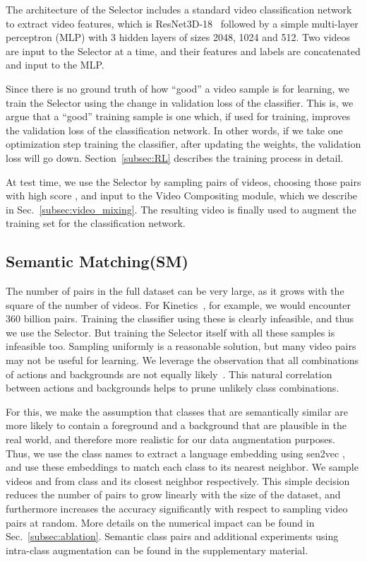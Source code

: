 \documentclass[runningheads]{llncs}
\newcommand{\SemanticMatch}{Semantic Matching\xspace}
\newcommand{\VideoMix}{Video Compositing\xspace}
\begin{document}
The architecture of the Selector includes a standard video classification network to extract video features, which is ResNet3D-18~\cite{resnet} followed by a simple multi-layer perceptron (MLP) with 3 hidden layers of sizes 2048, 1024 and 512. Two videos are input to the Selector at a time, and their features and labels are concatenated and input to the MLP. 

Since there is no ground truth of how ``good'' a video sample is for learning, we train the Selector using the change in validation loss of the classifier. This is, we argue that a ``good'' training sample is one which, if used for training, improves the validation loss of the classification network. In other words, if we take one optimization step training the classifier, after updating the weights, the validation loss will go down. Section~\ref{subsec:RL} describes the training process in detail. 


At test time, we use the Selector by sampling pairs of videos, choosing those pairs with high score , and input to the \VideoMix module, which we describe in Sec.~\ref{subsec:video_mixing}. The resulting video is finally used to augment the training set for the classification network. 






\subsection{\SemanticMatch (SM)}



The number of pairs in the full dataset can be very large, as it grows with the square of the number of videos. For Kinetics~\cite{carreira2017quo}, for example, we would encounter 360 billion pairs. Training the classifier using these is clearly infeasible, and thus we use the Selector. But training the Selector itself with all these samples is infeasible too. Sampling uniformly is a reasonable solution, but many video pairs may not be useful for learning. We leverage the observation that all combinations of actions and backgrounds are not equally likely~\cite{Choi-NeurIPS-2019}. This natural correlation between actions and backgrounds helps to prune unlikely class combinations. 

For this, we make the assumption that classes that are semantically similar are more likely to contain a foreground and a background that are plausible in the real world, and therefore more realistic for our data augmentation purposes. Thus, we use the class names to extract a language embedding using sen2vec \cite{sen2vec}, and use these embeddings to match each class to its nearest neighbor. We sample videos  and  from class  and its closest neighbor  respectively. This simple decision reduces the number of pairs to grow linearly with the size of the dataset, and furthermore increases the accuracy significantly with respect to sampling video pairs at random. More details on the numerical impact can be found in Sec.~\ref{subsec:ablation}. Semantic class pairs and additional experiments using intra-class augmentation can be found in the supplementary material. 
\end{document}
